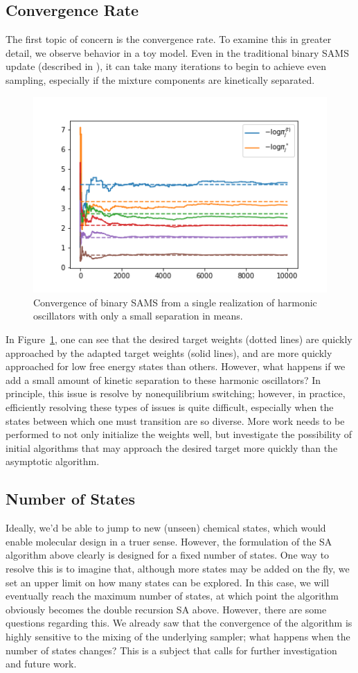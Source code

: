 \subsection{Convergence Rate}
%
The first topic of concern is the convergence rate.
%
To examine this in greater detail, we observe behavior in a toy model.
%
Even in the traditional binary SAMS update (described in \cite{Tan2017}), it can take many iterations to begin to achieve even sampling, especially if the mixture components are kinetically separated.
%
\begin{figure}
    \centering
    \includegraphics{logpitrace_s_smallsep.png}
    \caption{Convergence of binary SAMS from a single realization of harmonic oscillators with only a small separation in means.}
    \label{fig:smallsep}
\end{figure}
%
In Figure~\ref{fig:smallsep}, one can see that the desired target weights (dotted lines) are quickly approached by the adapted target weights (solid lines), and are more quickly approached for low free energy states than others.
%
However, what happens if we add a small amount of kinetic separation to these harmonic oscillators?
%
In principle, this issue is resolve by nonequilibrium switching; however, in practice, efficiently resolving these types of issues is quite difficult, especially when the states between which one must transition are so diverse.
%
More work needs to be performed to not only initialize the weights well, but investigate the possibility of initial algorithms that may approach the desired target more quickly than the asymptotic algorithm.
%
\subsection{Number of States}
%
Ideally, we'd be able to jump to new (unseen) chemical states, which would enable molecular design in a truer sense.
%
However, the formulation of the SA algorithm above clearly is designed for a fixed number of states.
%
One way to resolve this is to imagine that, although more states may be added on the fly, we set an upper limit on how many states can be explored.
%
In this case, we will eventually reach the maximum number of states, at which point the algorithm obviously becomes the double recursion SA above.
%
However, there are some questions regarding this.
%
We already saw that the convergence of the algorithm is highly sensitive to the mixing of the underlying sampler; what happens when the number of states changes?
%
This is a subject that calls for further investigation and future work.
%
